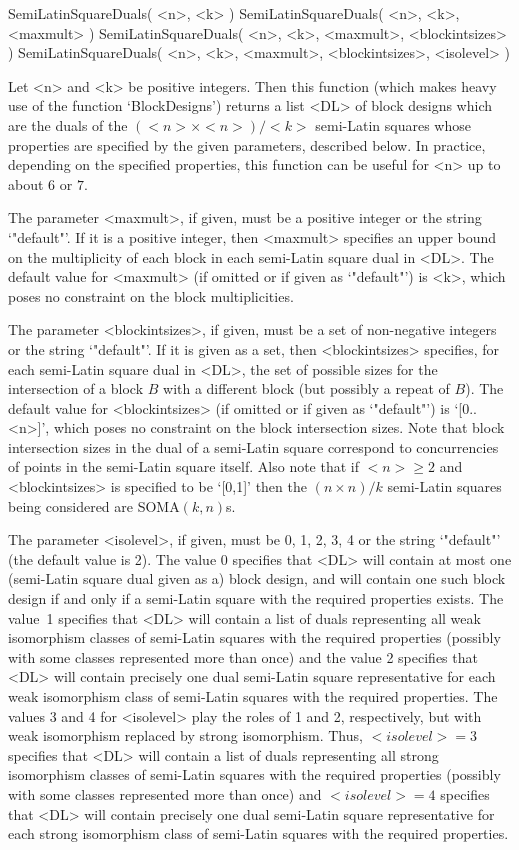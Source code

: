 
\>SemiLatinSquareDuals( <n>, <k> )
\>SemiLatinSquareDuals( <n>, <k>, <maxmult> )
\>SemiLatinSquareDuals( <n>, <k>, <maxmult>, <blockintsizes> )
\>SemiLatinSquareDuals( <n>, <k>, <maxmult>, <blockintsizes>, <isolevel> )

Let <n> and <k> be positive integers. Then this function (which makes
heavy use of the function `BlockDesigns') returns a list <DL> of block
designs which are the duals of the $(<n>\times <n>)/<k>$ semi-Latin
squares whose properties are specified by the given parameters, described
below. In practice, depending on the specified properties, this function
can be useful for <n> up to about $6$ or $7$.

The parameter <maxmult>, if given, must be a positive integer or
the string `"default"'. If it is a positive integer, then <maxmult>
specifies an upper bound on the multiplicity of each block in each
semi-Latin square dual in <DL>. The default value for <maxmult> (if
omitted or if given as `"default"') is <k>, which poses no constraint
on the block multiplicities.

The parameter <blockintsizes>, if given, must be a set of non-negative
integers or the string `"default"'.  If it is given as a set, then
<blockintsizes> specifies, for each semi-Latin square dual in <DL>,
the set of possible sizes for the intersection of a block $B$ with a
different block (but possibly a repeat of $B$).  The default value for
<blockintsizes> (if omitted or if given as `"default"') is `[0..<n>]',
which poses no constraint on the block intersection sizes. Note that
block intersection sizes in the dual of a semi-Latin square correspond
to concurrencies of points in the semi-Latin square itself. Also note
that if $<n>\ge2$ and <blockintsizes> is specified to be `[0,1]' then
the $(n\times n)/k$ semi-Latin squares being considered are SOMA$(k,n)$s.

The parameter <isolevel>, if given, must be 0, 1, 2, 3, 4 or the string
`"default"' (the default value is 2).  The value 0 specifies that <DL>
will contain at most one (semi-Latin square dual given as a) block design,
and will contain one such block design if and only if a semi-Latin square
with the required properties exists. The value~1 specifies that <DL>
will contain a list of duals representing all weak isomorphism classes
of semi-Latin squares with the required properties (possibly with some
classes represented more than once) and the value 2 specifies that <DL>
will contain precisely one dual semi-Latin square representative for
each weak isomorphism class of semi-Latin squares with the required
properties. The values 3 and 4 for <isolevel> play the roles of 1 and 2,
respectively, but with weak isomorphism replaced by strong isomorphism.
Thus, $<isolevel>=3$ specifies that <DL> will contain a list of duals
representing all strong isomorphism classes of semi-Latin squares with
the required properties (possibly with some classes represented more than
once) and $<isolevel>=4$ specifies that <DL> will contain precisely one
dual semi-Latin square representative for each strong isomorphism class
of semi-Latin squares with the required properties.

